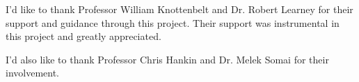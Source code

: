 \abstract

\thispagestyle{plain}
\setcounter{page}{2}

\begin{center}
  I'd like to thank Professor William Knottenbelt and Dr. Robert Learney for their support and guidance through this project. Their support was instrumental in this project and greatly appreciated.

  I'd also like to thank Professor Chris Hankin and Dr. Melek Somai for their involvement.
\end{center}

